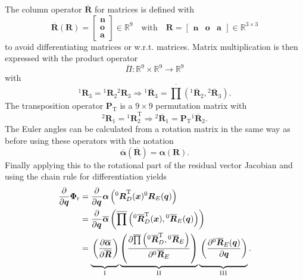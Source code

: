 \documentclass[twocolumn,10pt]{IFTOMM}
\newcommand{\bm}[1]{\boldsymbol{#1}}
\newcommand{\rotmat}[2]{{{ }^{#1}\boldsymbol{R}}_{#2}}
\newcommand{\rotmato}[2]{{{ }^{#1}\boldsymbol{\overline{R}}}_{#2}}
\newcommand{\transp}[0]{{\mathrm{T}}}
\begin{document}
The column operator $\overline{\bm{R}}$ for matrices is defined with
%
\begin{equation}
\overline{\bm{R}}(\bm{R})=\begin{bmatrix}
\bm{n} \\ \bm{o} \\ \bm{a}
\end{bmatrix} \in {\mathbb{R}}^{9}
\quad
\mathrm{with}
\quad
\bm{R}=\begin{bmatrix}
\bm{n} & \bm{o} & \bm{a}
\end{bmatrix}
 \in {\mathbb{R}}^{3 \times 3}
\end{equation}
%
to avoid differentiating matrices or w.r.t. matrices.
Matrix multiplication is then expressed with the product operator
%
\begin{equation}
\overline{\Pi}: {\mathbb{R}}^{9} \times {\mathbb{R}}^{9} \rightarrow {\mathbb{R}}^{9}
\label{equ:matprod_def}
\end{equation}
%
with
%
\begin{equation}
\rotmat{1}{3}
=
\rotmat{1}{2}
\rotmat{2}{3}
\Rightarrow
\rotmato{1}{3}
=
\overline{\prod}\left( \rotmato{1}{2}, \rotmato{2}{3}\right).
\label{equ:matprod}
\end{equation}
%
The transposition operator $\bm{P}_\transp$ is a $9 \times 9$ permutation matrix with
%
\begin{equation}
\rotmat{2}{1}
=
\rotmat{1}{2}^\transp
\Rightarrow
\rotmato{2}{1}
=
\bm{P}_\transp \rotmato{1}{2}.
\end{equation}
%
The Euler angles can be calculated from a rotation matrix in the same way as before using these operators with the notation
%
\begin{equation}
\overline{\bm{\alpha}}(\overline{\bm{R}})
=
\bm{\alpha}(\bm{R}).
\end{equation}
%
Finally applying this to the rotational part of the residual vector Jacobian and using the chain rule for differentiation yields
%
\begin{align}
\frac{\partial}{\partial \bm{q}}\bm{\Phi}_{\mathrm{r}}
&=
\frac{\partial}{\partial \bm{q}} \bm{\alpha}\left(\rotmat{0}{D}^\transp(\bm{x}) \rotmat{0}{E}(\bm{q})\right) \label{equ:grad_Phi_q}\\
&=
\frac{\partial}{\partial \bm{q}} \overline{\bm{\alpha}}\left(\overline{\prod}\left( \rotmato{0}{D}^\transp(\bm{x}), \rotmato{0}{E}(\bm{q})\right)\right) \nonumber \\
&=
\underbrace{\vphantom{\left(\frac{\partial \overline{\prod}\left(\rotmato{0}{D}^\transp, \rotmato{0}{E}\right)}{\partial \rotmato{0}{E}}\right)}\left(\frac{\partial \overline{\bm{\alpha}}}{\partial \overline{\bm{R}}}\right)}_{\mathrm{I}}
\underbrace{\left(\frac{\partial \overline{\prod}\left(\rotmato{0}{D}^\transp, \rotmato{0}{E}\right)}{\partial \rotmato{0}{E}}\right)}_{\mathrm{II}}
\underbrace{\vphantom{\left(\frac{\partial \overline{\prod}\left(\rotmato{0}{D}^\transp, \rotmato{0}{E}\right)}{\partial \rotmato{0}{E}}\right)}\left(\frac{\partial \rotmato{0}{E}(\bm{q})}{\partial \bm{q}} \right)}_{\mathrm{III}}.  \nonumber
\end{align}
\end{document}
